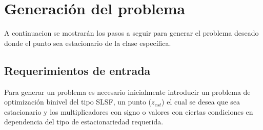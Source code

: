 \newpage

\section{Generación del problema}
A continuacion se mostrarán los pasos a seguir para generar el problema deseado donde el punto sea estacionario de la clase específica.
\subsection{Requerimientos de entrada}

Para generar un problema es necesario inicialmente introducir un problema de optimización binivel del tipo SLSF, un punto ($z_{est}$) el cual
se desea que sea estacionario y los multiplicadores con signo o valores con ciertas condiciones en dependencia del tipo de estacionariedad requerida.

